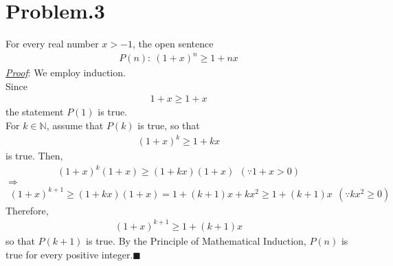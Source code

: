 \documentclass[12pt]{article}
\begin{document}
\section*{Problem.3}
For every real number $x > -1$,
the open sentence
\begin{gather*}
P(n):~ (1+x)^n \geq 1 + nx
\end{gather*}
\underline{\textit{Proof}}: We employ induction.\\[1em]
Since
\begin{gather*}
1 + x \geq 1 + x
\end{gather*}
the statement $P(1)$ is true.\\
For $k \in \mathbb{N}$, assume that $P(k)$ is true, so that
\begin{gather*}
(1+x)^k \geq 1 + kx
\end{gather*}
is true. Then,
\begin{align*}
(1+x)^{k} (1+x) \geq (1 + kx) (1+x) ~~\left(\because 1 + x > 0\right)
\end{align*}
$\Rightarrow$
\begin{align*}
(1+x)^{k+1} \geq (1 + kx) (1+x) = 1 + (k+1)x + k x^2 \geq 1 + (k+1)x ~~\left(\because k x^2 \geq 0\right)
\end{align*}
Therefore,
\begin{align*}
(1+x)^{k+1} \geq 1 + (k+1)x
\end{align*}
so that $P(k+1)$ is true. By the Principle of Mathematical Induction, $P(n)$ is true for every positive integer.$\blacksquare$
\end{document}
